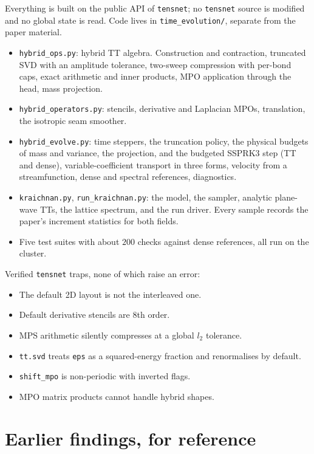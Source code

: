 \documentclass[aps,prfluids,reprint,onecolumn,amsmath,amssymb,nofootinbib,floatfix]{revtex4-2}
\newcommand{\code}[1]{\texttt{\small #1}}
\begin{document}
Everything is built on the public API of \code{tensnet}; no \code{tensnet}
source is modified and no global state is read. Code lives in
\code{time\_evolution/}, separate from the paper material.
\begin{itemize}
\item \code{hybrid\_ops.py}: hybrid TT algebra. Construction and contraction,
      truncated SVD with an amplitude tolerance, two-sweep compression with
      per-bond caps, exact arithmetic and inner products, MPO application
      through the head, mass projection.
\item \code{hybrid\_operators.py}: stencils, derivative and Laplacian MPOs,
      translation, the isotropic seam smoother.
\item \code{hybrid\_evolve.py}: time steppers, the truncation policy, the
      physical budgets of mass and variance, the projection, and the budgeted
      SSPRK3 step (TT and dense),
      variable-coefficient transport in three forms, velocity from a
      streamfunction, dense and spectral references, diagnostics.
\item \code{kraichnan.py}, \code{run\_kraichnan.py}: the model, the sampler,
      analytic plane-wave TTs, the lattice spectrum, and the run driver. Every
      sample records the paper's increment statistics for both fields.
\item Five test suites with about $200$ checks against dense references, all
      run on the cluster.
\end{itemize}
Verified \code{tensnet} traps, none of which raise an error:
\begin{itemize}
\item The default 2D layout is not the interleaved one.
\item Default derivative stencils are 8th order.
\item MPS arithmetic silently compresses at a global $l_2$ tolerance.
\item \code{tt.svd} treats \code{eps} as a squared-energy fraction and
      renormalises by default.
\item \code{shift\_mpo} is non-periodic with inverted flags.
\item MPO matrix products cannot handle hybrid shapes.
\end{itemize}

\section{Earlier findings, for reference}
\end{document}

